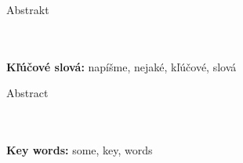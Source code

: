 \documentclass[a4paper,12pt,openany,oneside]{scrbook} %
\begin{document}
\noindent
\begin{center}
\begin{minipage}{1\textwidth}
\centerline{\large Abstrakt}

\\ \\ 
{\bf Kľúčové slová:} napíšme, nejaké, kľúčové, slová
\end{minipage}
\end{center}
\eject %

\noindent
\begin{center}
\begin{minipage}{1\textwidth}
\centerline{\large Abstract}

\\ \\
{\bf Key words:} some, key, words
\end{minipage}
\end{center}
\eject %

\tableofcontents

\mainmatter

\pagestyle{fancy}







\backmatter

{}
{}
\nocite{*}


\end{document}
